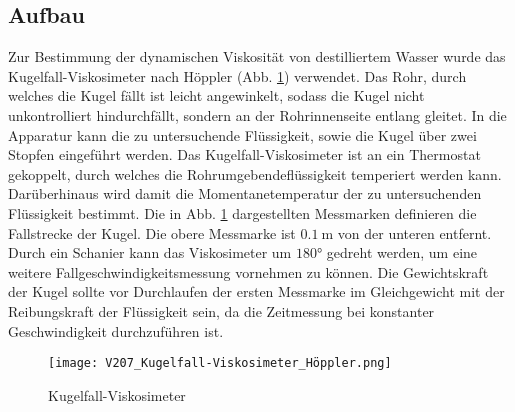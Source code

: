 \subsection{Aufbau}

Zur Bestimmung der dynamischen Viskosität von destilliertem Wasser wurde das Kugelfall-Viskosimeter nach Höppler (Abb. \ref{fig:Aufbau}) verwendet.
Das Rohr, durch welches die Kugel fällt ist leicht angewinkelt, sodass die Kugel nicht unkontrolliert hindurchfällt, sondern an der Rohrinnenseite
entlang gleitet.
In die Apparatur kann die zu untersuchende Flüssigkeit, sowie die Kugel über zwei Stopfen eingeführt werden. Das Kugelfall-Viskosimeter ist an ein Thermostat
gekoppelt, durch welches die Rohrumgebendeflüssigkeit temperiert werden kann. Darüberhinaus wird damit die Momentanetemperatur der zu untersuchenden
Flüssigkeit bestimmt. Die in Abb. \ref{fig:Aufbau} dargestellten Messmarken definieren die Fallstrecke der Kugel. Die obere Messmarke ist
$\SI{0,1}{\meter}$ von der unteren entfernt.
Durch ein Schanier kann das Viskosimeter um $\ang{180}$ gedreht werden, um eine weitere Fallgeschwindigkeitsmessung vornehmen zu können.
Die Gewichtskraft der Kugel sollte vor Durchlaufen der ersten Messmarke im Gleichgewicht mit der Reibungskraft der Flüssigkeit sein, da die Zeitmessung
bei konstanter Geschwindigkeit durchzuführen ist.

\begin{figure}
  \centering
  \texttt{[image: V207\_Kugelfall-Viskosimeter\_Höppler.png]}
  \caption{Kugelfall-Viskosimeter\cite{anleitung01}}
  \label{fig:Aufbau}
\end{figure}

\newpage
\printbibliography

